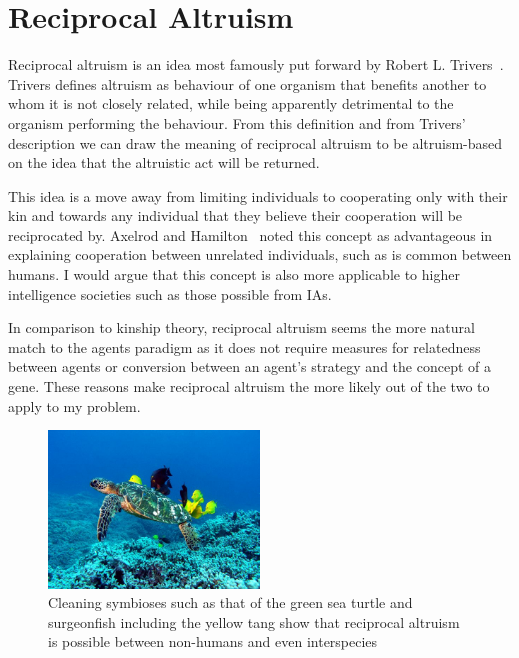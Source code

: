 \documentclass[]{final_report}
\begin{document}
\section{Reciprocal Altruism}
Reciprocal altruism is an idea most famously put forward by Robert L. Trivers~\cite{trivers1971evolution}. Trivers defines altruism as behaviour of one organism that benefits another to whom it is not closely related, while being apparently detrimental to the organism performing the behaviour. From this definition and from Trivers' description we can draw the meaning of reciprocal altruism to be altruism-based on the idea that the altruistic act will be returned.\par
This idea is a move away from limiting individuals to cooperating only with their kin and towards any individual that they believe their cooperation will be reciprocated by. Axelrod and Hamilton~\cite{evolution_of_cooperation} noted this concept as advantageous in explaining cooperation between unrelated individuals, such as is common between humans. I would argue that this concept is also more applicable to higher intelligence societies such as those possible from IAs.\par
In comparison to kinship theory, reciprocal altruism seems the more natural match to the agents paradigm as it does not require measures for relatedness between agents or conversion between an agent's strategy and the concept of a gene. These reasons make reciprocal altruism the more likely out of the two to apply to my problem.
\begin{figure}
	\center
	\includegraphics[width=0.5\textwidth]{Green_Sea_Turtle_Cleaning_Station.jpg}
	\caption{Cleaning symbioses such as that of the green sea turtle and surgeonfish including the yellow tang show that reciprocal altruism is possible between non-humans and even interspecies~\cite{turtle}}
	\label{fig:cleaning}
\end{figure}
\end{document}
